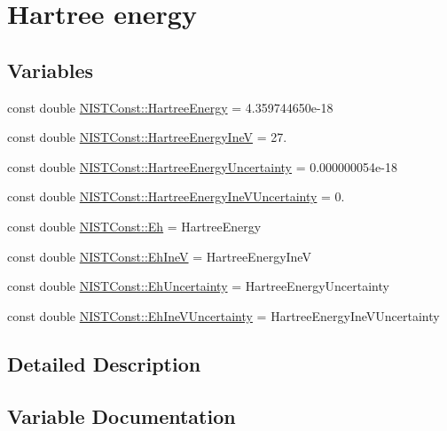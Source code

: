 \hypertarget{group___hartree_energy}{}\section{Hartree energy}
\label{group___hartree_energy}
\subsection*{Variables}
\begin{DoxyCompactItemize}
\item 
const double \hyperlink{group___hartree_energy_gab58dc1c4e59e83d4fb1217778fe9f29b}{N\+I\+S\+T\+Const\+::\+Hartree\+Energy} = 4.\+359744650e-\/18
\item 
const double \hyperlink{group___hartree_energy_ga400eb5b8c9b55b0f601870ba54120364}{N\+I\+S\+T\+Const\+::\+Hartree\+Energy\+IneV} = 27.
\item 
const double \hyperlink{group___hartree_energy_gaabdf38a4c491ca0f606bf042c8479801}{N\+I\+S\+T\+Const\+::\+Hartree\+Energy\+Uncertainty} = 0.\+000000054e-\/18
\item 
const double \hyperlink{group___hartree_energy_gaa6e7ae83f510023bdd88d80dae80f97d}{N\+I\+S\+T\+Const\+::\+Hartree\+Energy\+Ine\+V\+Uncertainty} = 0.
\item 
const double \hyperlink{group___hartree_energy_ga1955ca3dc0e0714b0caa7304e7389140}{N\+I\+S\+T\+Const\+::\+Eh} = Hartree\+Energy
\item 
const double \hyperlink{group___hartree_energy_ga45991f1895507078b66f94f85e2e8af5}{N\+I\+S\+T\+Const\+::\+Eh\+IneV} = Hartree\+Energy\+IneV
\item 
const double \hyperlink{group___hartree_energy_ga52137cfba941de2bd3b1b584bd1f31ee}{N\+I\+S\+T\+Const\+::\+Eh\+Uncertainty} = Hartree\+Energy\+Uncertainty
\item 
const double \hyperlink{group___hartree_energy_ga44de589dbe84c79573b441fa366d320d}{N\+I\+S\+T\+Const\+::\+Eh\+Ine\+V\+Uncertainty} = Hartree\+Energy\+Ine\+V\+Uncertainty
\end{DoxyCompactItemize}


\subsection{Detailed Description}


\subsection{Variable Documentation}
\mbox{\label{group___hartree_energy_ga1955ca3dc0e0714b0caa7304e7389140}} 
